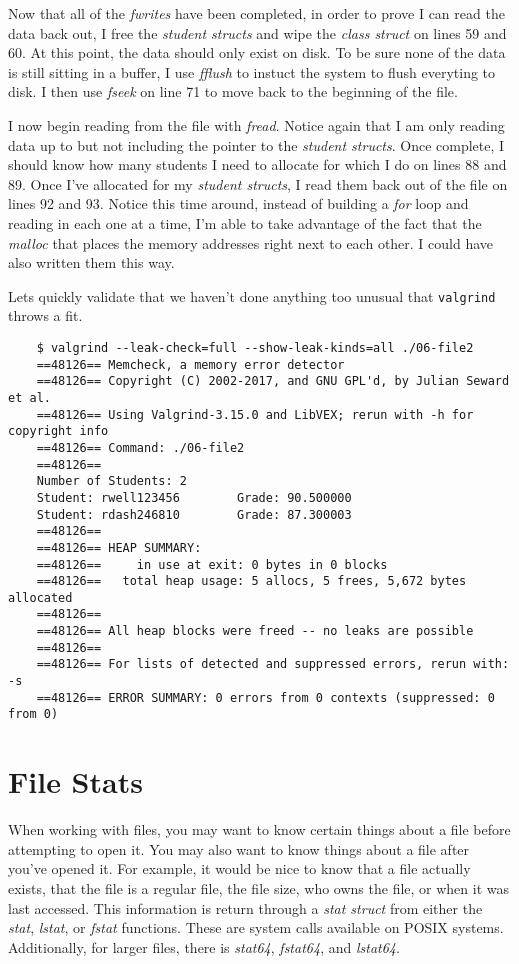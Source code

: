 \documentclass[../main.tex]{subfiles}
\begin{document}
	Now that all of the \textit{fwrites} have been completed, in order to prove I can read the data back out, I free the \textit{student structs} and wipe the \textit{class struct} on lines 59 and 60.  At this point, the data should only exist on disk.  To be sure none of the data is still sitting in a buffer, I use \textit{fflush} to instuct the system to flush everyting to disk.  I then use \textit{fseek} on line 71 to move back to the beginning of the file.
	
	I now begin reading from the file with \textit{fread}.  Notice again that I am only reading data up to but not including the pointer to the \textit{student structs}.  Once complete, I should know how many students I need to allocate for which I do on lines 88 and 89.  Once I've allocated for my \textit{student structs}, I read them back out of the file on lines 92 and 93.  Notice this time around, instead of building a \textit{for} loop and reading in each one at a time, I'm able to take advantage of the fact that the \textit{malloc} that places the memory addresses right next to each other.  I could have also written them this way.
	
	Lets quickly validate that we haven't done anything too unusual that \texttt{valgrind} throws a fit.
	  
	\begin{verbatim}
	$ valgrind --leak-check=full --show-leak-kinds=all ./06-file2
	==48126== Memcheck, a memory error detector
	==48126== Copyright (C) 2002-2017, and GNU GPL'd, by Julian Seward et al.
	==48126== Using Valgrind-3.15.0 and LibVEX; rerun with -h for copyright info
	==48126== Command: ./06-file2
	==48126== 
	Number of Students: 2
	Student: rwell123456        Grade: 90.500000
	Student: rdash246810        Grade: 87.300003
	==48126== 
	==48126== HEAP SUMMARY:
	==48126==     in use at exit: 0 bytes in 0 blocks
	==48126==   total heap usage: 5 allocs, 5 frees, 5,672 bytes allocated
	==48126== 
	==48126== All heap blocks were freed -- no leaks are possible
	==48126== 
	==48126== For lists of detected and suppressed errors, rerun with: -s
	==48126== ERROR SUMMARY: 0 errors from 0 contexts (suppressed: 0 from 0)
	\end{verbatim}
	
	\section{File Stats}
	
	When working with files, you may want to know certain things about a file before attempting to open it. You may also want to know things about a file after you've opened it. For example, it would be nice to know that a file actually exists, that the file is a regular file, the file size, who owns the file, or when it was last accessed.  This information is return through a \textit{stat struct} from either the \textit{stat}, \textit{lstat}, or \textit{fstat} functions.  These are system calls available on POSIX systems.  Additionally, for larger files, there is \textit{stat64}, \textit{fstat64}, and \textit{lstat64}.
		
\end{document}

